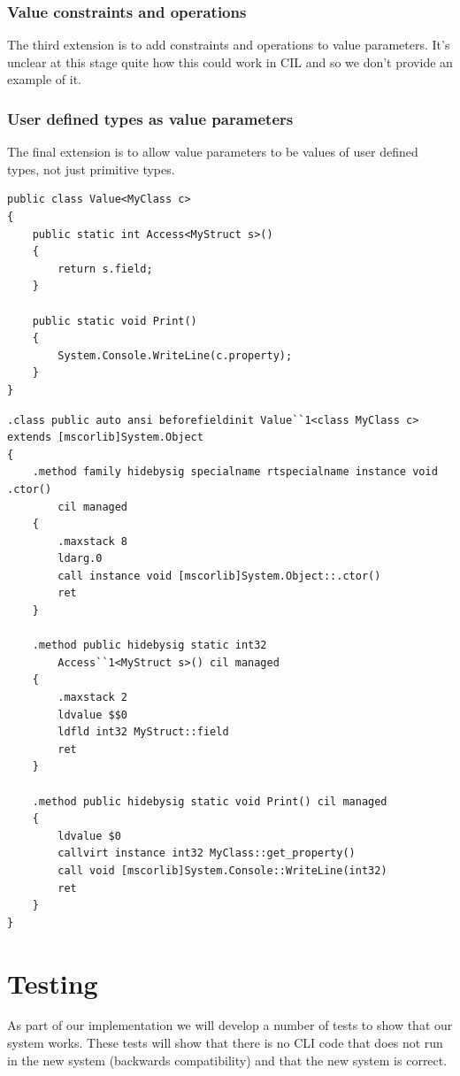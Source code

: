 \documentclass[english]{report}
\begin{document}
\subsection{Value constraints and operations}

The third extension is to add constraints and operations to value
parameters. It's unclear at this stage quite how this could work in
CIL and so we don't provide an example of it.


\subsection{User defined types as value parameters}

The final extension is to allow value parameters to be values of user
defined types, not just primitive types.

\begin{lstlisting}[caption={User defined types as value parameters in extended C\#},keywordstyle={\color{blue}},language=sharpc]
public class Value<MyClass c>
{
	public static int Access<MyStruct s>()
	{
		return s.field;
	}

	public static void Print()
	{
		System.Console.WriteLine(c.property);
	}
}
\end{lstlisting}


\begin{lstlisting}[caption={Corresponding CIL},language=cil]
.class public auto ansi beforefieldinit Value``1<class MyClass c>
extends [mscorlib]System.Object 
{
	.method family hidebysig specialname rtspecialname instance void .ctor() 
		cil managed
	{
		.maxstack 8
		ldarg.0
		call instance void [mscorlib]System.Object::.ctor()
		ret
	}

	.method public hidebysig static int32 
		Access``1<MyStruct s>() cil managed
	{
		.maxstack 2
		ldvalue $$0
		ldfld int32 MyStruct::field
		ret
	}

	.method public hidebysig static void Print() cil managed
	{
		ldvalue $0
		callvirt instance int32 MyClass::get_property()    
		call void [mscorlib]System.Console::WriteLine(int32)
		ret
	}
}
\end{lstlisting}

\chapter{Testing}

As part of our implementation we will develop a number of tests to show that
our system works. These tests will show that there is no CLI code that does
not run in the new system (backwards compatibility) and that the new system is
correct.
\end{document}
